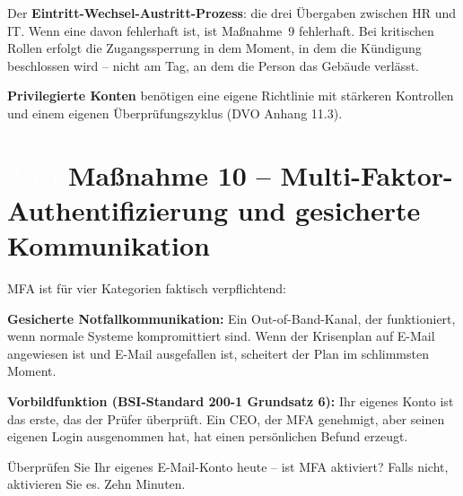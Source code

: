 \documentclass[11pt,a4paper,twoside]{book}
\newcommand{\lessontag}[1]{%
  \texorpdfstring{%
    \setlength{\fboxsep}{3pt}\colorbox{nisd2blue}{\textcolor{white}{\footnotesize\bfseries #1}}\quad%
  }{Lektion #1\ }%
}
\begin{document}
Der \textbf{Eintritt-Wechsel-Austritt-Prozess}: die drei Übergaben zwischen HR und IT. Wenn eine davon fehlerhaft ist, ist Maßnahme~9 fehlerhaft. Bei kritischen Rollen erfolgt die Zugangssperrung in dem Moment, in dem die Kündigung beschlossen wird -- nicht am Tag, an dem die Person das Gebäude verlässt.

\textbf{Privilegierte Konten} benötigen eine eigene Richtlinie mit stärkeren Kontrollen und einem eigenen Überprüfungszyklus (DVO Anhang 11.3).

\section{\lessontag{2.15}Maßnahme 10 -- Multi-Faktor-Authentifizierung und gesicherte Kommunikation}

MFA ist für vier Kategorien faktisch verpflichtend:

\begin{center}
\end{center}

\textbf{Gesicherte Notfallkommunikation:} Ein Out-of-Band-Kanal, der funktioniert, wenn normale Systeme kompromittiert sind. Wenn der Krisenplan auf E-Mail angewiesen ist und E-Mail ausgefallen ist, scheitert der Plan im schlimmsten Moment.

\textbf{Vorbildfunktion (BSI-Standard 200-1 Grundsatz 6):} Ihr eigenes Konto ist das erste, das der Prüfer überprüft. Ein CEO, der MFA genehmigt, aber seinen eigenen Login ausgenommen hat, hat einen persönlichen Befund erzeugt.

\begin{actionbox}
Überprüfen Sie Ihr eigenes E-Mail-Konto heute -- ist MFA aktiviert? Falls nicht, aktivieren Sie es. Zehn Minuten.
\end{actionbox}
\end{document}
